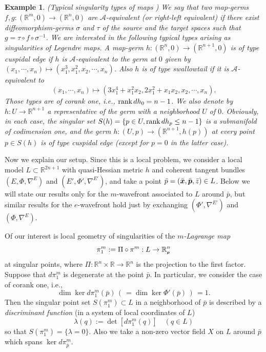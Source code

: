 \documentclass[10pt]{amsart}
\newcommand{\A}{\mathcal{A}}
\newcommand{\R}{\mathbb{R}}
\newcommand\rank{\mbox{\rm rank}\,}
\def\bx{\mbox{\boldmath $x$}}
\def\bp{\mbox{\boldmath $p$}}
\def\bbp{\mbox{\tiny$\bp$}}
\newtheorem{exam}[thm]{\bf Example}
\begin{document}
\begin{exam}\upshape 
{(Typical singularity types of maps \cite{AGV, IS})} 
We say that two map-germs $f, g: (\R^m, 0) \to (\R^n, 0)$ are {\em $\A$-equivalent} (or right-left equivalent) if there exist diffeomorphism-germs 
$\sigma$ and $\tau$ of the source and the target spaces such that $g=\tau \circ f \circ \sigma^{-1}$. 
We are interested in the following typical types arising as singularities of Legendre maps. 
A map-germ $h: (\R^n, 0) \to (\R^{n+1}, 0)$ is of type {\em cuspidal edge} if $h$ is $\A$-equivalent to the germ at $0$ given by $(x_1, \cdots, x_n) \mapsto (x_1^3, x_1^2, x_2, \cdots, x_n)$. 
Also $h$ is of type {\em swallowtail} if it is $\A$-equivalent to 
$$(x_1, \cdots, x_n) \mapsto (3x_1^4+x_1^2x_2, 2x_1^2+x_1x_2, x_2, \cdots, x_n).$$
Those types are of corank one, i.e., $\rank dh_0=n-1$. 
We also denote by $h: U \to \R^{n+1}$ a representative of the germ with a neighborhood $U$ of $0$.  Obviously, in each case, the singular set $S(h)=\{p \in U, \rank dh_p \le n-1\}$ is a submanifold of codimension one, and the germ $h: (U, p) \to (\R^{n+1}, h(p))$ at every point  $p \in S(h)$ is of type cuspidal edge (except for $p=0$ in the latter case).  
 \end{exam}

Now we explain our setup. Since this is a local problem, 
we consider a local model $L \subset \R^{2n+1}$ with quasi-Hessian metric $h$ and coherent tangent bundles $(E, \Phi, \nabla^E)$ and $(E', \Phi', \nabla^{E'})$, and take a point $\bar{p}=(\bar{\bx}, \bar{\bp}, \bar{z}) \in L$. 
Below we will state our results only for the $m$-wavefront associated to $L$ around $\bar{p}$, but similar results for the $e$-wavefront hold just by exchanging $(\Phi', \nabla^{E'})$ and $(\Phi, \nabla^E)$. 

Of our interest is local geometry of singularities of the {\em $m$-Lagrange map}
$$\pi^m_1:=\Pi\circ\pi^m: L\to \R^n_{\bbp}$$ 
at singular points, where $\Pi:\R^n\times\R\to\R^n$ is the projection to the first factor. 
Suppose that $d\pi^m_1$ is degenerate at the point $\bar{p}$. 
In particular, we consider the case of corank one, i.e., 
$$\dim \ker d\pi^m_1(\bar{p})\,  (\, = \dim \ker \Phi' (\bar{p})\, )\, =1.$$
Then the singular point set $S(\pi^m_1) \subset L$ in a neighborhood of $\bar{p}$ is described by a {\em discriminant function} (in a system of local coordinates of $L$)  
$$\lambda (q):=\det\left[d\pi^m_1(q)\right] \quad (q \in L)$$ 
so that $S(\pi^m_1)=\{\lambda=0\}$.  
Also we take a non-zero vector field $X$ on $L$ around $\bar{p}$ which spans $\ker d\pi^m_{\bar{p}}$. 
\end{document}
